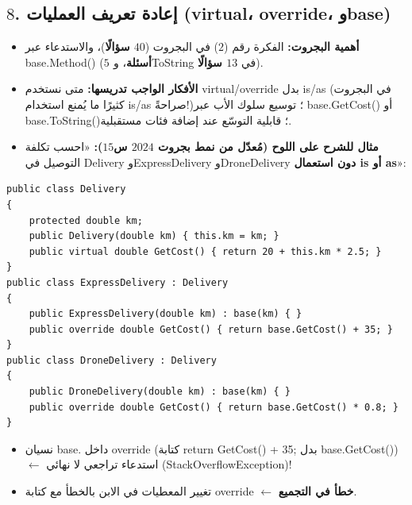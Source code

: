 \documentclass[14pt]{extarticle}
\begin{document}
\filbreak
\subsection*{$8$. إعادة تعريف العمليات (\textenglish{virtual}، \textenglish{override}، و\textenglish{base})}
\begin{itemize}[itemsep=0.25em]
    \item \textbf{أهمية البجروت:} الفكرة رقم ($2$) في البجروت (\textbf{$40$ سؤالًا})، والاستدعاء عبر \textenglish{base.Method()} (\textbf{$5$ أسئلة}، و\textenglish{ToString} في \textbf{$13$ سؤالًا}).
    \item \textbf{الأفكار الواجب تدريسها:} متى نستخدم \textenglish{virtual}/\textenglish{override} بدل \textenglish{is}/\textenglish{as} (في البجروت كثيرًا ما يُمنع استخدام \textenglish{is}/\textenglish{as} صراحةً!)؛ توسيع سلوك الأب عبر \textenglish{base.GetCost()} أو \textenglish{base.ToString()}؛ قابلية التوسّع عند إضافة فئات مستقبلية.
    \item \textbf{مثال للشرح على اللوح (مُعدّل من نمط بجروت $2024$ س$15$):} «احسب تكلفة التوصيل في \textenglish{Delivery} و\textenglish{ExpressDelivery} و\textenglish{DroneDelivery} \textbf{دون استعمال \textenglish{is} أو \textenglish{as}}»:
\end{itemize}
\begin{boxCode}
\begin{english}
\begin{verbatim}
public class Delivery
{
    protected double km;
    public Delivery(double km) { this.km = km; }
    public virtual double GetCost() { return 20 + this.km * 2.5; }
}
public class ExpressDelivery : Delivery
{
    public ExpressDelivery(double km) : base(km) { }
    public override double GetCost() { return base.GetCost() + 35; }
}
public class DroneDelivery : Delivery
{
    public DroneDelivery(double km) : base(km) { }
    public override double GetCost() { return base.GetCost() * 0.8; }
}
\end{verbatim}
\end{english}
\end{boxCode}
\begin{boxWarning}
\begin{itemize}
    \item نسيان \textenglish{base.} داخل \textenglish{override} (كتابة \textenglish{return GetCost() + 35;} بدل \textenglish{base.GetCost()}) $\leftarrow$ استدعاء تراجعي لا نهائي (\textenglish{StackOverflowException})!
    \item تغيير المعطيات في الابن بالخطأ مع كتابة \textenglish{override} $\leftarrow$ \textbf{خطأ في التجميع}.
\end{itemize}
\end{boxWarning}
\end{document}
